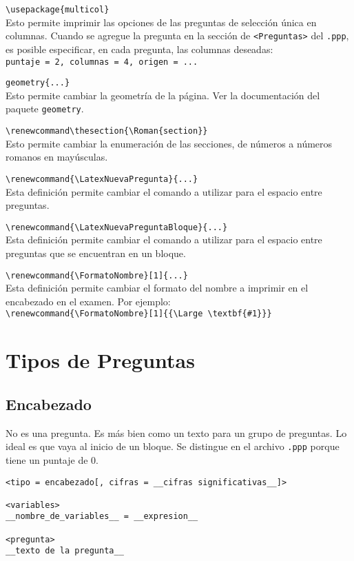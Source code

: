 \documentclass[12pt]{article}
\theoremstyle{definition}
\begin{document}
\noindent \verb|\usepackage{multicol}| \\
Esto permite imprimir las opciones de las preguntas de selecci\'on \'unica en columnas. Cuando se agregue la pregunta en la secci\'on de \verb|<Preguntas>| del \verb|.ppp|, es posible especificar, en cada pregunta, las columnas deseadas: \\
\verb|puntaje = 2, columnas = 4, origen = ...|
\medskip

\noindent \verb|geometry{...}| \\
  Esto permite cambiar la geometr\'ia de la p\'agina. Ver la documentaci\'on del paquete \verb|geometry|.
\medskip

\noindent \verb|\renewcommand\thesection{\Roman{section}}| \\
  Esto permite cambiar la enumeraci\'on de las secciones, de n\'umeros a n\'umeros romanos en may\'usculas.

\noindent \verb|\renewcommand{\LatexNuevaPregunta}{...}| \\
Esta definici\'on permite cambiar el comando a utilizar para el espacio entre preguntas.
\medskip

\noindent \verb|\renewcommand{\LatexNuevaPreguntaBloque}{...}| \\
Esta definici\'on permite cambiar el comando a utilizar para el espacio entre preguntas que se encuentran en un bloque.
\medskip

\noindent \verb|\renewcommand{\FormatoNombre}[1]{...}| \\
Esta definici\'on permite cambiar el formato del nombre a imprimir en el encabezado en el examen. Por ejemplo: \\
\verb|\renewcommand{\FormatoNombre}[1]{{\Large \textbf{#1}}}|
\medskip


\section{Tipos de Preguntas}

\subsection{Encabezado}
No es una pregunta. Es más bien como un texto para un grupo de preguntas. Lo ideal es que vaya al inicio de un bloque. Se distingue en el archivo \verb|.ppp| porque tiene un puntaje de 0.

\small
\begin{verbatim}
<tipo = encabezado[, cifras = __cifras significativas__]>

<variables>
__nombre_de_variables__ = __expresion__

<pregunta>
__texto de la pregunta__
\end{verbatim}
\normalsize
\end{document}
